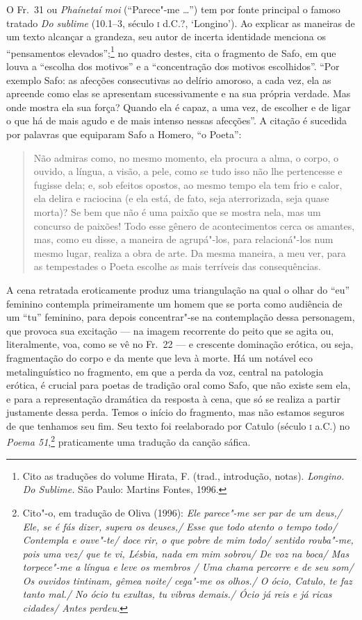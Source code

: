 {\small O Fr.~31 ou \textit{Phaínetaí moi} (“Parece"-me \ldots{}”) tem por fonte
principal o famoso tratado \textit{Do sublime} (10.1--3, século \textsc{i} d.C.?, `Longino'). Ao
explicar as maneiras de um texto alcançar a grandeza, seu autor de incerta identidade menciona os
“pensamentos elevados”;\footnote{ Cito as traduções do volume Hirata,
F. (trad., introdução, notas). \textit{Longino.} \textit{Do Sublime.} São
Paulo: Martins Fontes, 1996.} no quadro destes, cita o fragmento de Safo,
em que louva a “escolha dos motivos” e a “concentração dos
motivos escolhidos”. ``Por exemplo Safo: as afecções consecutivas ao delírio
amoroso, a cada vez, ela as apreende como elas se apresentam sucessivamente e
na sua própria verdade. Mas onde mostra ela sua força? Quando ela é capaz, a
uma vez, de escolher e de ligar o que há de mais agudo e de mais
intenso nessas afecções”. A citação é sucedida por palavras que equiparam Safo
a Homero, “o Poeta”: 

\begin{quote}
Não admiras como, no mesmo momento, ela
procura a alma, o corpo, o ouvido, a língua, a visão, a pele, como se tudo isso
não lhe pertencesse e fugisse dela; e, sob efeitos opostos, ao mesmo tempo ela
tem frio e calor, ela delira e raciocina (e ela está, de fato, seja
aterrorizada, seja quase morta)? Se bem que não é uma paixão que se mostra
nela, mas um concurso de paixões! Todo esse gênero de acontecimentos cerca os
amantes, mas, como eu disse, a maneira de agrupá"-los, para relacioná"-los num
mesmo lugar, realiza a obra de arte. Da mesma maneira, a meu ver, para as
tempestades o Poeta escolhe as mais terríveis das consequências.
\end{quote}

A cena retratada eroticamente produz uma triangulação na qual o olhar do “eu”
feminino contempla primeiramente um homem que se porta como audiência de um
“tu” feminino, para depois concentrar"-se na contemplação dessa
personagem, que provoca sua excitação --- na imagem recorrente do peito que se agita ou,
literalmente, voa, como se vê no Fr.~22 --- e crescente dominação erótica, ou
seja, fragmentação do corpo e da mente que leva à morte. Há um notável eco
metalinguístico no fragmento, em que a perda da voz, central na patologia
erótica, é crucial para poetas de tradição oral como Safo, que não existe sem
ela, e para a representação dramática da resposta à cena, que só se realiza a
partir justamente dessa perda. Temos o início do fragmento, mas não estamos
seguros de que tenhamos seu fim. Seu texto foi reelaborado por Catulo (século \textsc{i}
a.C.) no \textit{Poema 51},\footnote{ Cito"-o, em tradução de Oliva (1996):
\textit{Ele parece"-me ser par de um deus,/ Ele, se é fás dizer, supera os
deuses,/ Esse que todo atento o tempo todo/ Contempla e ouve"-te/ doce rir, o
que pobre de mim todo/ sentido rouba"-me, pois uma vez/ que te vi, Lésbia,
nada em mim sobrou/ De voz na boca/ Mas torpece"-me a língua e leve os membros
/ Uma chama percorre e de seu som/ Os ouvidos tintinam, gêmea noite/ cega"-me
os olhos./ O ócio, Catulo, te faz tanto mal./ No ócio tu exultas, tu vibras
demais./ Ócio já reis e já ricas cidades/ Antes perdeu.}} praticamente uma
tradução da canção sáfica.}

